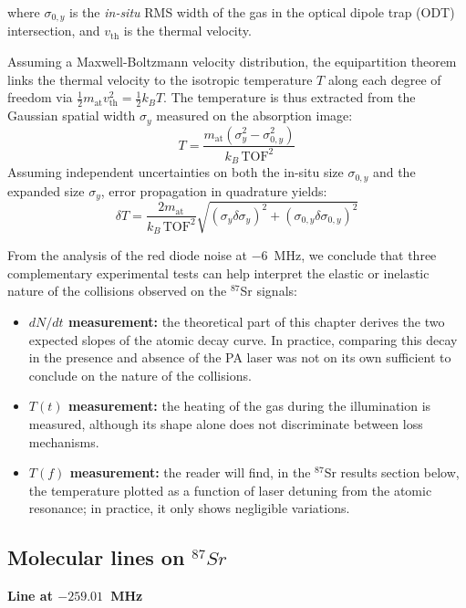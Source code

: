 where $\sigma_{0,y}$ is the \textit{in-situ} RMS width of the gas in the optical dipole trap (ODT) intersection, and $v_{\text{th}}$ is the thermal velocity. 

Assuming a Maxwell-Boltzmann velocity distribution, the equipartition theorem links the thermal velocity to the isotropic temperature $T$ along each degree of freedom via 
$\frac{1}{2} m_{\text{at}} v_{\text{th}}^2 = \frac{1}{2} k_B T$. The temperature is thus extracted from the Gaussian spatial width $\sigma_y$ measured on the absorption image:
\begin{equation}
    T = \frac{m_{\text{at}} \left(\sigma_y^2 - \sigma_{0,y}^2\right)}{k_B \, \text{TOF}^2}
\end{equation}
Assuming independent uncertainties on both the in-situ size $\sigma_{0,y}$ and the expanded size $\sigma_y$, error propagation in quadrature yields:
\begin{equation}
    \delta T = \frac{2 m_{\text{at}}}{k_B \, \text{TOF}^2} \sqrt{\left(\sigma_y \delta \sigma_y\right)^2 + \left(\sigma_{0,y} \delta \sigma_{0,y}\right)^2}
\label{eq:deltaT}
\end{equation}

From the analysis of the red diode noise at $-6$~MHz, we conclude that three
complementary experimental tests can help interpret the elastic or inelastic nature of
the collisions observed on the $^{87}$Sr signals:
\begin{itemize}
    \item \textbf{$dN/dt$ measurement:} the theoretical part of this chapter derives the
    two expected slopes of the atomic decay curve. In practice, comparing this decay in
    the presence and absence of the PA laser was not on its own sufficient to conclude
    on the nature of the collisions.
    \item \textbf{$T(t)$ measurement:} the heating of the gas during the illumination is
    measured, although its shape alone does not discriminate between loss mechanisms.
    \item \textbf{$T(f)$ measurement:} the reader will find, in the $^{87}$Sr results
    section below, the temperature plotted as a function of laser detuning from the
    atomic resonance; in practice, it only shows negligible variations.
\end{itemize}

\subsection{Molecular lines on $^{87}Sr$}
\label{raie sr87 }
\textbf{Line at $-259.01$~MHz}

